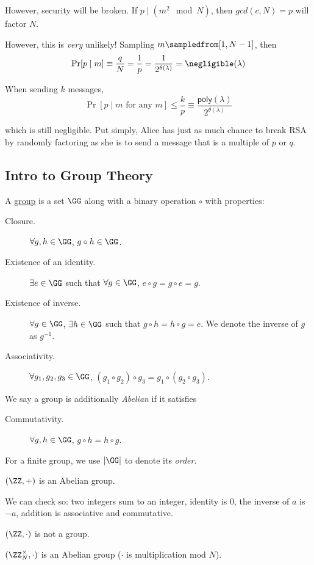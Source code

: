 However, security will be broken. If $p\mid (m^2\mod N)$, then $gcd(c, N) = p$ will factor $N$.

However, this is \emph{very} unlikely! Sampling $m\sampledfrom [1, N-1]$, then
\[\Pr[p\mid m] \equiv \frac{q}{N} = \frac{1}{p} = \frac{1}{2^{\theta(\lambda)}}=\negligible(\lambda)\]

When sending $k$ messages,
\[\Pr[p\mid m\text{ for any }m] \leq \frac{k}{p} \equiv \frac{\mathsf{poly}(\lambda)}{2^{\theta(\lambda)}}\]

which is still negligible. Put simply, Alice has just as much chance to break RSA by randomly factoring as she is to send a message that is a multiple of $p$ or $q$.

\subsection{Intro to Group Theory}
\begin{definition}[Group]
    A \ul{group} is a set $\GG$ along with a binary operation $\circ$ with properties:
    \begin{description}
        \item[Closure.] $\forall g, h\in \GG$, $g\circ h\in \GG$.
        \item[Existence of an identity.] $\exists e\in \GG$ such that $\forall g\in \GG$, $e\circ g = g\circ e = g$.
        \item[Existence of inverse.] $\forall g\in \GG$, $\exists h\in \GG$ such that $g\circ h = h\circ g = e$. We denote the inverse of $g$ as $g^{-1}$.
        \item[Associativity.] $\forall g_1, g_2, g_3\in \GG$, $(g_1\circ g_2)\circ g_3 = g_1\circ(g_2\circ g_3)$.
    \end{description}

    We say a group is additionally \emph{Abelian} if it satisfies
    \begin{description}
        \item[Commutativity.] $\forall g, h\in \GG$, $g\circ h = h \circ g$.
    \end{description}
    For a finite group, we use $|\GG|$ to denote its \emph{order}.
\end{definition}
\begin{example}
    $(\ZZ, +)$ is an Abelian group.

    We can check so: two integers sum to an integer, identity is $0$, the inverse of $a$ is $-a$, addition is associative and commutative.

    $(\ZZ, \cdot)$ is not a group.

    $(\ZZ_N^\times, \cdot)$ is an Abelian group ($\cdot$ is multiplication mod $N$).
\end{example}

